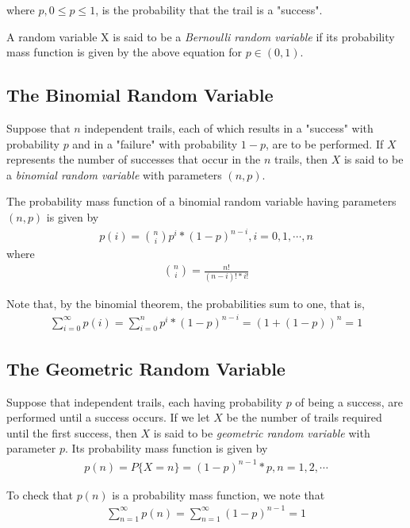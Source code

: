 \documentclass[10 pt,final]{article}
\newcommand{\impo}[1]{{\color{magenta} #1}}
\begin{document}
where $p, 0 \leq p \leq 1$, is the probability that the trail is a "success".

A random variable X is said to be a \emph{Bernoulli random variable}
if its probability mass function is given by the above equation for $p \in (0,1)$.

\subsection{The Binomial Random Variable}
Suppose that $n$ independent trails, each of which results in a "success" with probability $p$ and in a "failure" with probability $1-p$, are to be performed. If \impo{$X$ represents the number of successes that occur in the $n$ trails}, then $X$ is said to be a \impo{\emph{binomial random variable}} with parameters $(n,p)$.

The probability mass function of a binomial random variable having parameters $(n,p)$ is given by
\begin{align*}
p(i) = \binom{n}{i} p^i *(1-p)^{n-i}, i=0,1, \cdots, n
\end{align*}
where 
\begin{align*}
\binom{n}{i} = \frac{n!}{(n-i)!*i!}
\end{align*}

Note that, by the binomial theorem, the probabilities sum to one, that is,
\begin{align*}
\sum^{\infty}_{i=0} p(i) = \sum^n_{i=0} p^i*(1-p)^{n-i} = (1+(1-p))^n = 1
\end{align*}


\subsection{The Geometric Random Variable}
Suppose that independent trails, each having probability $p$ of being a success, are performed until a success occurs. If we let \impo{$X$ be the number of trails required until the first success}, then $X$ is said to be \impo{\emph{geometric random variable}} with parameter $p$. Its probability mass function is given by
\begin{align*}
p(n) = P\{X=n\} = (1-p)^{n-1}*p, n=1,2,\cdots
\end{align*}

To check that $p(n)$ is a probability mass function, we note that 
\begin{align*}
\sum^{\infty}_{n=1} p(n) = \sum^{\infty}_{n=1} (1-p)^{n-1} = 1
\end{align*}
\end{document}
